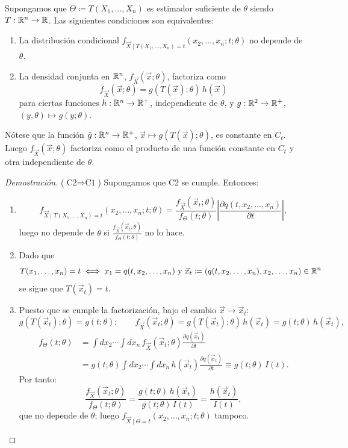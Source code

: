 \begin{teorema}
Supongamos que $\Theta \coloneqq T(X_1, \dots, X_n)$ es estimador suficiente de $\theta$ siendo $T : \mathbb{R}^n \to \mathbb{R}$. Las siguientes condiciones son equivalentes:
\begin{enumerate}
  \item La distribución condicional $f_{\vec{X} \mid T(X_1, \dots, X_n) = t}(x_2, \dots, x_n; t; \theta)$ no depende de $\theta$.
  \item La densidad conjunta en $\mathbb{R}^n$, $f_{\vec{X}}(\vec{x};\theta)$, factoriza como
  \[\boxed{
    f_{\vec{X}}(\vec{x};\theta) = g(T(\vec{x});\theta)\,h(\vec{x})}
  \]
  para ciertas funciones $h : \mathbb{R}^n \to \mathbb{R}^+$, independiente de $\theta$, y $g : \mathbb{R}^2 \to \mathbb{R}^+$, $(y,\theta) \mapsto g(y;\theta)$.
\end{enumerate}
Nótese que la función $\tilde g: \mathbb{R}^n \to \mathbb{R}^+$, $\vec{x} \mapsto g(T(\vec{x});\theta)$, es constante en $C_t$. Luego $f_{\vec{X}}(\vec{x};\theta)$ factoriza como el producto de una función constante en $C_t$ y otra independiente de $\theta$.
\end{teorema}

\begin{proof}[Demostración]
($\text{C2} \Rightarrow \text{C1}$) Supongamos que C2 se cumple. Entonces:
\begin{enumerate}
    \item 
\[
  f_{\vec{X} \mid T(X_1, \dots, X_n) = t}(x_2, \dots, x_n; t; \theta) = \frac{f_{\vec{X}}(\vec{x}_t;\theta)}{f_{\Theta}(t;\theta)}\left|\frac{\partial q(t, x_2, \dots, x_n)}{\partial t}\right|,
\]
luego no depende de $\theta$ si $\frac{f_{\vec{X}}(\vec{x}_t;\theta)}{f_{\Theta}(t;\theta)}$ no lo hace.
\item Dado que 
$$T(x_1, \dots, x_n) = t \iff x_1 = q(t, x_2, \dots, x_n)  \text{ y }  \vec{x}_t \coloneqq (q(t, x_2, \dots, x_n), x_2, \dots, x_n) \in \mathbb{R}^n$$
se sigue que $T(\vec{x}_t) = t$. 
\item Puesto que se cumple la factorización, bajo el cambio $\vec{x} \to \vec{x}_t$:
\[
  g(T(\vec{x}_t);\theta) = g(t;\theta); \qquad f_{\vec{X}}(\vec{x}_t;\theta) = g(T(\vec{x}_t);\theta)\,h(\vec{x}_t) = g(t;\theta)\,h(\vec{x}_t),
\]
\begin{align*}    
  f_{\Theta}(t;\theta) & = \int dx_2 \cdots \int dx_n \, f_{\vec{X}}(\vec{x}_t;\theta)\frac{\partial q(\vec{x}_t)}{\partial t} \\ & = g(t;\theta) \int dx_2 \cdots \int dx_n \, h(\vec{x}_t)\frac{\partial q(\vec{x}_t)}{\partial t} \equiv g(t;\theta)\,I(t).
\end{align*}
Por tanto:
\[
  \frac{f_{\vec{X}}(\vec{x}_t;\theta)}{f_{\Theta}(t;\theta)} = \frac{g(t;\theta)\,h(\vec{x}_t)}{g(t;\theta)\,I(t)} = \frac{h(\vec{x}_t)}{I(t)},
\]
que no depende de $\theta$; luego $f_{\vec{X} \mid \Theta = t}(x_2, \dots, x_n; t; \theta)$ tampoco.
\end{enumerate}
\end{proof}

